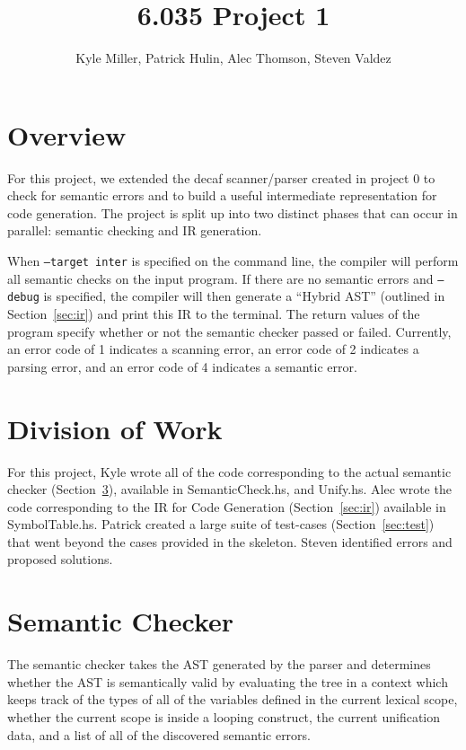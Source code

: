 \documentclass[11pt]{article}
\title{6.035 Project 1}
\author{Kyle Miller, Patrick Hulin, Alec Thomson, Steven Valdez}
\begin{document}
\maketitle

\section{Overview} 

For this project, we extended the decaf scanner/parser created in project 0 to 
check for semantic errors and to build a useful intermediate representation for 
code generation. The project is split up into two distinct phases that can 
occur in parallel: semantic checking and IR generation. 

When \texttt{--target inter} is specified on the command line, the compiler 
will perform all semantic checks on the input program. If there are no semantic 
errors and \texttt{--debug} is specified, the compiler will then generate a 
``Hybrid AST'' (outlined in Section~\ref{sec:ir}) and print this IR to the 
terminal. The return values of the program specify whether or not the semantic 
checker passed or failed. Currently, an error code of 1 indicates a scanning 
error, an error code of 2 indicates a parsing error, and an error code of 4 
indicates a semantic error.

\section{Division of Work} 

For this project, Kyle wrote all of the code corresponding to the
actual semantic checker (Section~\ref{sec:checker}), available in
SemanticCheck.hs, and Unify.hs. Alec wrote the code corresponding to
the IR for Code Generation (Section~\ref{sec:ir}) available in
SymbolTable.hs. Patrick created a large suite of test-cases
(Section~\ref{sec:test}) that went beyond the cases provided in the
skeleton. Steven identified errors and proposed solutions. 

\section{Semantic Checker}
\label{sec:checker}

The semantic checker takes the AST generated by the parser and
determines whether the AST is semantically valid by evaluating the
tree in a context which keeps track of the types of all of the
variables defined in the current lexical scope, whether the current
scope is inside a looping construct, the current unification data, and
a list of all of the discovered semantic errors.
\end{document}
